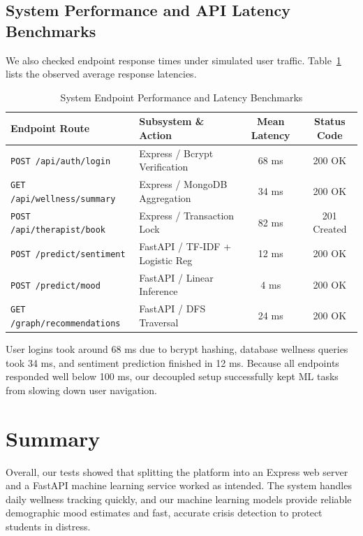 \documentclass[a4paper,11pt]{report}
\begin{document}
\subsection{System Performance and API Latency Benchmarks}
We also checked endpoint response times under simulated user traffic. Table~\ref{tab:api_benchmarks} lists the observed average response latencies.

\begin{table}[H]
\centering
\caption{System Endpoint Performance and Latency Benchmarks}
\label{tab:api_benchmarks}
\begin{tabular}{llcc}
\toprule
\textbf{Endpoint Route} & \textbf{Subsystem \& Action} & \textbf{Mean Latency} & \textbf{Status Code} \\
\midrule
\texttt{POST /api/auth/login}      & Express / Bcrypt Verification   & 68 ms  & 200 OK \\
\texttt{GET /api/wellness/summary}  & Express / MongoDB Aggregation   & 34 ms  & 200 OK \\
\texttt{POST /api/therapist/book}  & Express / Transaction Lock      & 82 ms  & 201 Created \\
\texttt{POST /predict/sentiment}   & FastAPI / TF-IDF + Logistic Reg & 12 ms  & 200 OK \\
\texttt{POST /predict/mood}        & FastAPI / Linear Inference      & 4 ms   & 200 OK \\
\texttt{GET /graph/recommendations}& FastAPI / DFS Traversal         & 24 ms  & 200 OK \\
\bottomrule
\end{tabular}
\end{table}

\noindent User logins took around 68 ms due to bcrypt hashing, database wellness queries took 34 ms, and sentiment prediction finished in 12 ms. Because all endpoints responded well below 100 ms, our decoupled setup successfully kept ML tasks from slowing down user navigation.

\section{Summary}
Overall, our tests showed that splitting the platform into an Express web server and a FastAPI machine learning service worked as intended. The system handles daily wellness tracking quickly, and our machine learning models provide reliable demographic mood estimates and fast, accurate crisis detection to protect students in distress.
\end{document}
